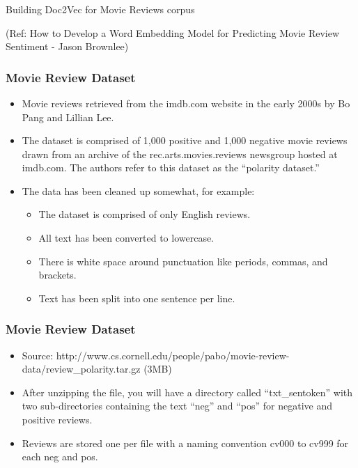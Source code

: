 \begin{frame}[fragile]\frametitle{}

\begin{center}
{\Large Building Doc2Vec for Movie Reviews corpus}
\end{center}

{\tiny (Ref: How to Develop a Word Embedding Model for Predicting Movie Review Sentiment - Jason Brownlee)}
\end{frame}

\begin{frame}[fragile]\frametitle{Movie Review Dataset}
\begin{itemize}
\item Movie reviews retrieved from the imdb.com website in the early 2000s by Bo Pang and Lillian Lee.
\item The dataset is comprised of 1,000 positive and 1,000 negative movie reviews drawn from an archive of the rec.arts.movies.reviews newsgroup hosted at imdb.com. The authors refer to this dataset as the “polarity dataset.”
\item The data has been cleaned up somewhat, for example:
\begin{itemize}
\item The dataset is comprised of only English reviews.
\item All text has been converted to lowercase.
\item There is white space around punctuation like periods, commas, and brackets.
\item Text has been split into one sentence per line.
\end{itemize}
\end{itemize}
\end{frame}

\begin{frame}[fragile]\frametitle{Movie Review Dataset}
\begin{itemize}
\item Source: http://www.cs.cornell.edu/people/pabo/movie-review-data/review\_polarity.tar.gz (3MB)
\item After unzipping the file, you will have a directory called “txt\_sentoken” with two sub-directories containing the text “neg” and “pos” for negative and positive reviews. 
\item Reviews are stored one per file with a naming convention cv000 to cv999 for each neg and pos.
\end{itemize}
\end{frame}

